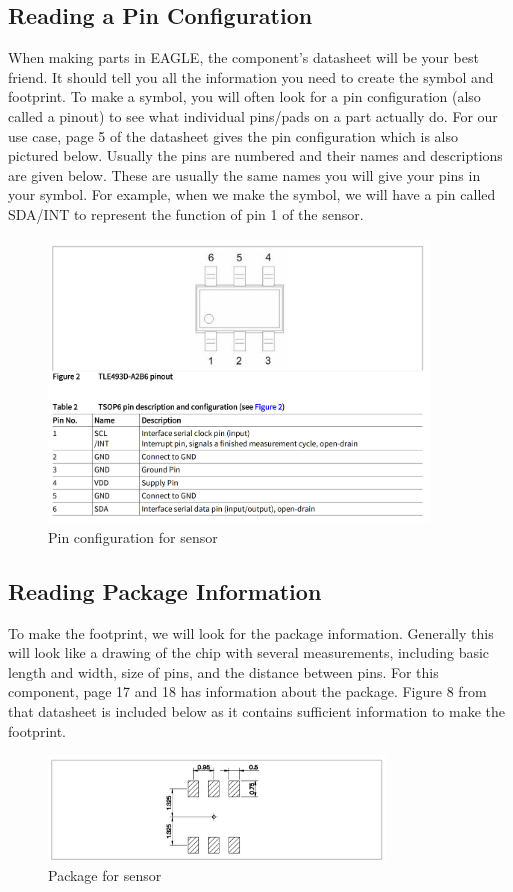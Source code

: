\documentclass{article}
\begin{document}
\subsection{Reading a Pin Configuration}
When making parts in EAGLE, the component's datasheet will be your best friend. It should tell you all the information you need to create the symbol and footprint. To make a symbol, you will often look for a pin configuration (also called a pinout) to see what individual pins/pads on a part actually do. For our use case, page 5 of the datasheet gives the pin configuration which is also pictured below. Usually the pins are numbered and their names and descriptions are given below. These are usually the same names you will give your pins in your symbol. For example, when we make the symbol, we will have a pin called SDA/INT to represent the function of pin 1 of the sensor.
\begin{figure}[ht]
    \center
	\includegraphics[width=0.9\textwidth, keepaspectratio]{images/pinconfig.png}
	\caption{Pin configuration for sensor}
	\label{fig:pinconfig}
\end{figure}

\subsection{Reading Package Information}
To make the footprint, we will look for the package information. Generally this will look like a drawing of the chip with several measurements, including basic length and width, size of pins, and the distance between pins. For this component, page 17 and 18 has information about the package. Figure 8 from that datasheet is included below as it contains sufficient information to make the footprint. 
\begin{figure}[ht]
    \center
	\includegraphics[width=0.8\textwidth, keepaspectratio]{images/package.png}
	\caption{Package for sensor} 
	\label{fig:package}
\end{figure}
\end{document}
